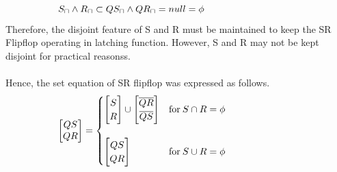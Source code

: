 \documentclass[10pt,journal]{IEEEtran}
\begin{document}
\begin{equation}
 \begin{minipage}{250pt}
\begin{flushleft} $\displaystyle S_{\sqcap} \wedge R_{\sqcap} \subset QS_{\sqcap} \wedge QR_{\sqcap} = null = \phi$  \end{flushleft}
 \end{minipage}
 \end{equation}
Therefore, the disjoint feature of S and R must be maintained to keep the     SR Flipflop operating in latching function. However, S and R may not be     kept disjoint for practical reasonss. \\ \ \\ 
Hence, the set equation of SR flipflop was expressed as follows.
\begin{equation}
 \begin{minipage}{250pt}
\begin{flushleft} $\displaystyle \left[\begin{matrix}QS\\QR\end{matrix}\right]=\begin{cases} \left[\begin{matrix}S\\R\end{matrix}\right] \cup \left[\begin{matrix}\overline{QR}\\\overline{QS}\end{matrix}\right] & \text{for}\: S \cap R = \phi \\ \ \\ \left[\begin{matrix}QS\\QR\end{matrix}\right] & \text{for}\: S \cup R = \phi \end{cases}$  \end{flushleft}
 \end{minipage}
 \end{equation}
\end{document}
